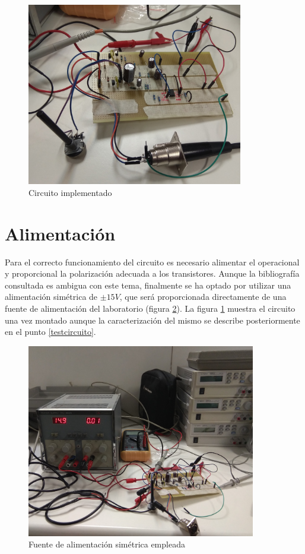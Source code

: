 \begin{figure}[!hbt]
\begin{center}
\includegraphics[height=8cm]{img/circuito.jpg}
\caption{\label{fig:placacircuito}Circuito implementado}
\end{center}
\end{figure}

\section{Alimentación}
Para el correcto funcionamiento del circuito es necesario alimentar el operacional y proporcional la polarización adecuada a los transistores. Aunque la bibliografía consultada es ambigua con este tema, finalmente se ha optado por utilizar una alimentación simétrica de $\pm15V$, que será proporcionada directamente de una fuente de alimentación del laboratorio (figura \ref{fig:fuente}). La figura \ref{fig:placacircuito} muestra el circuito una vez montado aunque la caracterización del mismo se describe posteriormente en el punto \ref{testcircuito}.

\begin{figure}[!hbt]
\begin{center}
\includegraphics[width=10cm]{img/fuente.jpg}
\caption{\label{fig:fuente}Fuente de alimentación simétrica empleada}
\end{center}
\end{figure}


